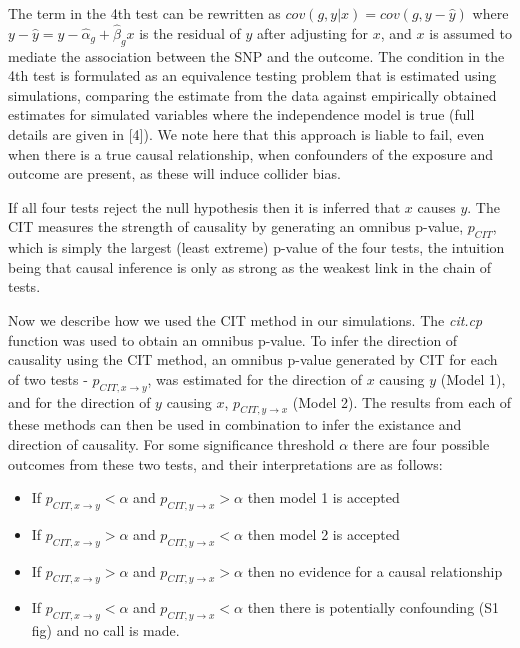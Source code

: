 \documentclass[]{article}
\providecommand{\tightlist}{%
  \setlength{\itemsep}{0pt}\setlength{\parskip}{0pt}}
\begin{document}
The term in the 4th test can be rewritten as
\(cov(g, y|x) = cov(g, y - \hat{y})\) where
\(y - \hat{y} = y - \hat{\alpha}_g + \hat{\beta}_g x\) is the residual
of \(y\) after adjusting for \(x\), and \(x\) is assumed to mediate the
association between the SNP and the outcome. The condition in the 4th
test is formulated as an equivalence testing problem that is estimated
using simulations, comparing the estimate from the data against
empirically obtained estimates for simulated variables where the
independence model is true (full details are given in {[}4{]}). We note
here that this approach is liable to fail, even when there is a true
causal relationship, when confounders of the exposure and outcome are
present, as these will induce collider bias.

If all four tests reject the null hypothesis then it is inferred that
\(x\) causes \(y\). The CIT measures the strength of causality by
generating an omnibus p-value, \(p_{CIT}\), which is simply the largest
(least extreme) p-value of the four tests, the intuition being that
causal inference is only as strong as the weakest link in the chain of
tests.

Now we describe how we used the CIT method in our simulations. The
\emph{cit.cp} function was used to obtain an omnibus p-value. To infer
the direction of causality using the CIT method, an omnibus p-value
generated by CIT for each of two tests - \(p_{CIT, x \rightarrow y}\),
was estimated for the direction of \(x\) causing \(y\) (Model 1), and
for the direction of \(y\) causing \(x\), \(p_{CIT, y \rightarrow x}\)
(Model 2). The results from each of these methods can then be used in
combination to infer the existance and direction of causality. For some
significance threshold \(\alpha\) there are four possible outcomes from
these two tests, and their interpretations are as follows:

\begin{itemize}
\tightlist
\item
  If \(p_{CIT, x \rightarrow y} < \alpha\) and
  \(p_{CIT, y \rightarrow x} > \alpha\) then model 1 is accepted
\item
  If \(p_{CIT, x \rightarrow y} > \alpha\) and
  \(p_{CIT, y \rightarrow x} < \alpha\) then model 2 is accepted
\item
  If \(p_{CIT, x \rightarrow y} > \alpha\) and
  \(p_{CIT, y \rightarrow x} > \alpha\) then no evidence for a causal
  relationship
\item
  If \(p_{CIT, x \rightarrow y} < \alpha\) and
  \(p_{CIT, y \rightarrow x} < \alpha\) then there is potentially
  confounding (S1 fig) and no call is made.
\end{itemize}
\end{document}
